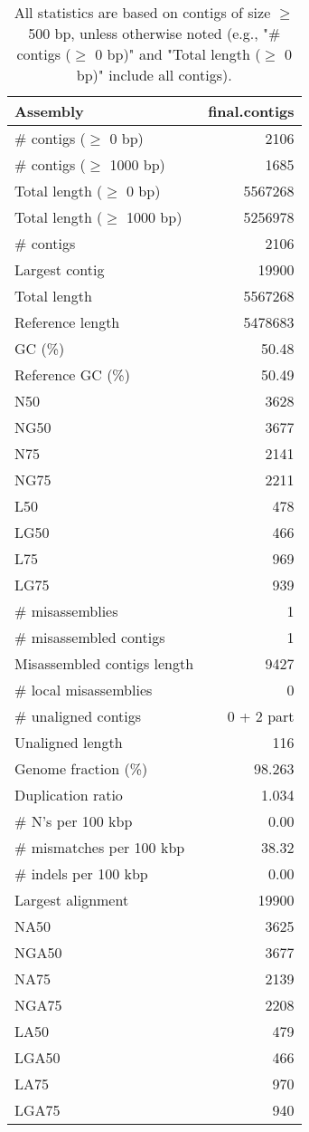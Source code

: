 \documentclass[12pt,a4paper]{article}
\begin{document}
\begin{table}[ht]
\begin{center}
\caption{All statistics are based on contigs of size $\geq$ 500 bp, unless otherwise noted (e.g., "\# contigs ($\geq$ 0 bp)" and "Total length ($\geq$ 0 bp)" include all contigs).}
\begin{tabular}{|l*{1}{|r}|}
\hline
Assembly & final.contigs \\ \hline
\# contigs ($\geq$ 0 bp) & 2106 \\ \hline
\# contigs ($\geq$ 1000 bp) & 1685 \\ \hline
Total length ($\geq$ 0 bp) & 5567268 \\ \hline
Total length ($\geq$ 1000 bp) & 5256978 \\ \hline
\# contigs & 2106 \\ \hline
Largest contig & 19900 \\ \hline
Total length & 5567268 \\ \hline
Reference length & 5478683 \\ \hline
GC (\%) & 50.48 \\ \hline
Reference GC (\%) & 50.49 \\ \hline
N50 & 3628 \\ \hline
NG50 & 3677 \\ \hline
N75 & 2141 \\ \hline
NG75 & 2211 \\ \hline
L50 & 478 \\ \hline
LG50 & 466 \\ \hline
L75 & 969 \\ \hline
LG75 & 939 \\ \hline
\# misassemblies & 1 \\ \hline
\# misassembled contigs & 1 \\ \hline
Misassembled contigs length & 9427 \\ \hline
\# local misassemblies & 0 \\ \hline
\# unaligned contigs & 0 + 2 part \\ \hline
Unaligned length & 116 \\ \hline
Genome fraction (\%) & 98.263 \\ \hline
Duplication ratio & 1.034 \\ \hline
\# N's per 100 kbp & 0.00 \\ \hline
\# mismatches per 100 kbp & 38.32 \\ \hline
\# indels per 100 kbp & 0.00 \\ \hline
Largest alignment & 19900 \\ \hline
NA50 & 3625 \\ \hline
NGA50 & 3677 \\ \hline
NA75 & 2139 \\ \hline
NGA75 & 2208 \\ \hline
LA50 & 479 \\ \hline
LGA50 & 466 \\ \hline
LA75 & 970 \\ \hline
LGA75 & 940 \\ \hline
\end{tabular}
\end{center}
\end{table}
\end{document}
